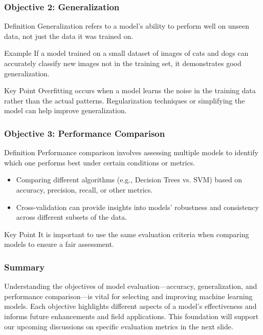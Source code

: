 \documentclass[aspectratio=169]{beamer}
\begin{document}
\begin{frame}[fragile]
    \frametitle{Objective 2: Generalization}
    
    \begin{block}{Definition}
        Generalization refers to a model's ability to perform well on unseen data, not just the data it was trained on.
    \end{block}
    
    \begin{block}{Example}
        If a model trained on a small dataset of images of cats and dogs can accurately classify new images not in the training set, it demonstrates good generalization.
    \end{block}
    
    \begin{block}{Key Point}
        Overfitting occurs when a model learns the noise in the training data rather than the actual patterns. Regularization techniques or simplifying the model can help improve generalization.
    \end{block}
\end{frame}

\begin{frame}[fragile]
    \frametitle{Objective 3: Performance Comparison}
    
    \begin{block}{Definition}
        Performance comparison involves assessing multiple models to identify which one performs best under certain conditions or metrics.
    \end{block}
    
    \begin{itemize}
        \item Comparing different algorithms (e.g., Decision Trees vs. SVM) based on accuracy, precision, recall, or other metrics.
        \item Cross-validation can provide insights into models’ robustness and consistency across different subsets of the data.
    \end{itemize}

    \begin{block}{Key Point}
        It is important to use the same evaluation criteria when comparing models to ensure a fair assessment.
    \end{block}
\end{frame}

\begin{frame}[fragile]
    \frametitle{Summary}
    
    Understanding the objectives of model evaluation—accuracy, generalization, and performance comparison—is vital for selecting and improving machine learning models. Each objective highlights different aspects of a model's effectiveness and informs future enhancements and field applications. 
    This foundation will support our upcoming discussions on specific evaluation metrics in the next slide.
\end{frame}
\end{document}
